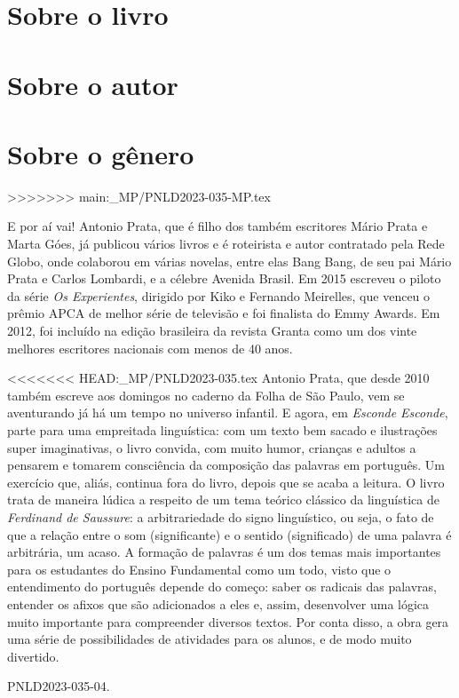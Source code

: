 \documentclass[11pt]{extarticle}
\begin{document}
 \section{Sobre o livro}
 \section{Sobre o autor}
 \section{Sobre o gênero}
>>>>>>> main:_MP/PNLD2023-035-MP.tex

E por aí vai! Antonio Prata, que é  filho dos também escritores Mário Prata e Marta Góes, já publicou vários livros e é roteirista e autor contratado pela Rede Globo, onde colaborou em várias novelas, entre elas Bang Bang, de seu pai Mário Prata e Carlos Lombardi, e a célebre Avenida Brasil. Em 2015 escreveu o piloto da série \textit{Os Experientes}, dirigido por Kiko e Fernando Meirelles, que venceu o prêmio APCA de melhor série de televisão e foi finalista do Emmy Awards. Em 2012, foi incluído na edição brasileira da revista Granta como um dos vinte melhores escritores nacionais com menos de 40 anos.

<<<<<<< HEAD:_MP/PNLD2023-035.tex
Antonio Prata, que desde 2010 também escreve aos domingos no caderno da Folha de São Paulo, vem se aventurando já há um tempo no universo infantil. E agora, em \textit{Esconde Esconde}, parte para uma empreitada linguística: com um texto bem sacado e ilustrações super imaginativas, o livro convida, com muito humor, crianças e adultos a pensarem e tomarem consciência da composição das palavras em português. Um exercício que, aliás, continua fora do livro, depois que se acaba a leitura. O livro trata de maneira lúdica a respeito de um tema teórico clássico da linguística de \textit{Ferdinand de Saussure}: a arbitrariedade do signo linguístico, ou seja, o fato de que a relação entre o som (significante) e o sentido (significado) de uma palavra é arbitrária, um acaso. A formação de palavras é um dos temas mais importantes para os estudantes do Ensino Fundamental como um todo, visto que o entendimento do português depende do começo: saber os radicais das palavras, entender os afixos que são adicionados a eles e, assim, desenvolver uma lógica muito importante para compreender diversos textos. Por conta disso, a obra gera uma série de possibilidades de atividades para os alunos, e de modo muito divertido. 

PNLD2023-035-04.
\end{document}
